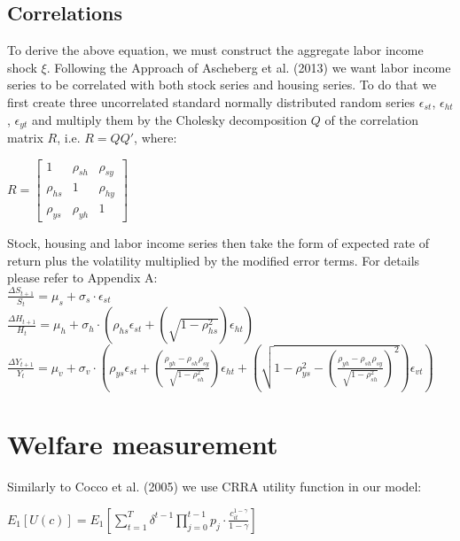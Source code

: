 \subsection{Correlations}

To derive the above equation, we must construct the aggregate labor income shock $\xi$. Following the Approach of Ascheberg et al. (2013) we want labor income series to be correlated with both stock series and housing series. To do that we first create three uncorrelated standard normally distributed random series $\epsilon_{st}$, $\epsilon_{ht}$, $\epsilon_{yt}$ and multiply them by the Cholesky decomposition $Q$ of the correlation matrix $R$, i.e. $R = QQ'$, where:

\begin{center}
	$R = \begin{bmatrix}
					1 & \rho_{sh} & \rho_{sy} \\
					\rho_{hs} & 1 & \rho_{hy} \\
					\rho_{ys} & \rho_{yh} & 1
			\end{bmatrix}
	$
\end{center}

Stock, housing and labor income series then take the form of expected rate of return plus the volatility multiplied by the modified error terms. For details please refer to Appendix A:\\
$\frac{\Delta S_{t+1}}{S_t} = \mu_s + \sigma_s \cdot \epsilon_{st}$\\
$\frac{\Delta H_{t+1}}{H_t} = \mu_h + \sigma_h \cdot \left(\rho_{hs}\epsilon_{st} + (\sqrt{1-\rho^2_{hs}})\epsilon_{ht}\right)$\\
$\frac{\Delta Y_{t+1}}{Y_t} = \mu_v + \sigma_v \cdot \left(\rho_{ys}\epsilon_{st} + \left(\frac{\rho_{yh} - \rho_{sh}\rho_{sy}}{\sqrt{1-\rho^2_{sh}}}\right)\epsilon_{ht} + \left(\sqrt{1-\rho^2_{ys}-(\frac{\rho_{yh} - \rho_{sh}\rho_{sy}}{\sqrt{1-\rho^2_{sh}}})^2}\right)\epsilon_{vt}\right)$

\section{Welfare measurement}
Similarly to Cocco et al. (2005) we use CRRA utility function in our model:

\begin{center}
	$E_1[U(c)] = E_1 \left[\displaystyle\sum^T_{t=1} \delta^{t-1} \displaystyle\prod^{t-1}_{j=0} p_j \cdot \frac{c^{1-\gamma}_{it}}{1-\gamma}\right]$
\end{center}

